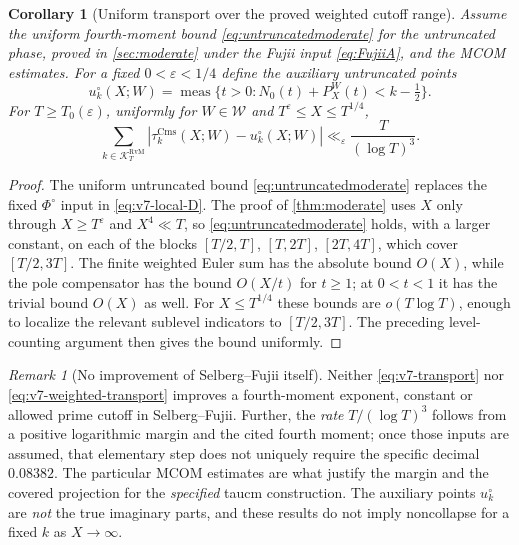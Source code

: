 \documentclass[11pt,a4paper]{article}
\numberwithin{equation}{section}
\newtheorem{corollary}[theorem]{Corollary}
\theoremstyle{definition}
\theoremstyle{remark}
\newtheorem{remark}[theorem]{Remark}
\newcommand{\meas}{\operatorname{meas}}
\newcommand{\Cms}{\mathrm{Cms}}
\begin{document}
\begin{corollary}[Uniform transport over the proved weighted cutoff range]
\label{cor:v7-weighted-transport}
Assume the uniform fourth-moment bound \eqref{eq:untruncatedmoderate} for the untruncated phase, proved in
\cref{sec:moderate} under the Fujii input \eqref{eq:FujiiA}, and the
MCOM estimates. For a fixed $0<\varepsilon<1/4$ define the
\emph{auxiliary} untruncated points
\begin{equation}
 u_k^\circ(X;W)=\meas\{t>0:N_0(t)+P_X^W(t)<k-\tfrac12\}.
\end{equation}
For $T\ge T_0(\varepsilon)$, uniformly for $W\in\mathcal W$ and
$T^\varepsilon\le X\le T^{1/4}$,
\begin{equation}\label{eq:v7-weighted-transport}
 \sum_{k\in\mathcal K_T^{\mathrm{RvM}}}
 |\tau_k^{\Cms}(X;W)-u_k^\circ(X;W)|
 \ll_\varepsilon\frac{T}{(\log T)^3}.
\end{equation}
\end{corollary}
\begin{proof}
The uniform untruncated bound \eqref{eq:untruncatedmoderate} replaces the fixed $\Phi^\circ$
input in \eqref{eq:v7-local-D}. The proof of \cref{thm:moderate} uses $X$ only through $X\ge T^\varepsilon$ and $X^4\ll T$, so \eqref{eq:untruncatedmoderate} holds, with a larger constant, on each of the blocks $[T/2,T]$, $[T,2T]$, $[2T,4T]$, which cover $[T/2,3T]$. The finite weighted Euler sum
has the absolute bound $O(X)$, while the pole compensator has the
bound $O(X/t)$ for $t\ge1$; at $0<t<1$ it has the trivial bound
$O(X)$ as well. For $X\le T^{1/4}$ these bounds are
$o(T\log T)$, enough to localize the relevant sublevel
indicators to $[T/2,3T]$. The preceding level-counting argument
then gives the bound uniformly.
\end{proof}

\begin{remark}[No improvement of Selberg--Fujii itself]
Neither \eqref{eq:v7-transport} nor
\eqref{eq:v7-weighted-transport} improves a fourth-moment
exponent, constant or allowed prime cutoff in Selberg--Fujii.
Further, the \emph{rate} $T/(\log T)^3$ follows from a positive
logarithmic margin and the cited fourth moment; once those inputs
are assumed, that elementary step does not uniquely require the
specific decimal $0.08382$. The particular MCOM estimates are
what justify the margin and the covered projection for the
\emph{specified} taucm construction. The auxiliary points
$u_k^\circ$ are \emph{not} the true imaginary parts, and these results
do not imply noncollapse for a fixed $k$ as $X\to\infty$.
\end{remark}
\end{document}
